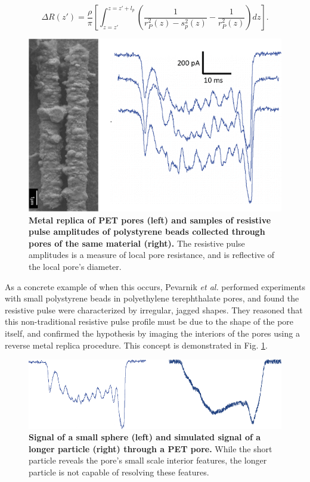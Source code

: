 			\begin{equation} \label{eq:localdR}
				\Delta R\left(z'\right)=\frac{\rho}{\pi}\left[\int_{z=z'}^{z=z'+l_{p}}\left(\frac{1}{r^{2}_{P}\left(z\right)-s^{2}_{p}\left(z\right)}-\frac{1}{r^{2}_{P}\left(z\right)}\right)dz\right].
			\end{equation}
			
			\begin{figure}
				\includegraphics[width=.5\textwidth]{particlesreveal.png}
				\caption{\textbf{Metal replica of PET pores (left) and samples of resistive pulse amplitudes of polystyrene beads collected through pores of the same material (right).} The resistive pulse amplitudes is a measure of local pore resistance, and is reflective of the local pore's diameter.}
				\label{fig:particlesreveal}
			\end{figure}

			
			
			As a concrete example of when this occurs, Pevarnik \textit{et al.} performed experiments with small polystyrene beads in polyethylene terephthalate pores, and found the resistive pulse were characterized by irregular, jagged shapes. They reasoned that this non-traditional resistive pulse profile must be due to the shape of the pore itself, and confirmed the hypothesis by imaging the interiors of the pores using a reverse metal replica procedure. This concept is demonstrated in Fig. \ref{fig:particlesreveal}.
			
			
			\begin{figure}
				\includegraphics[width=\textwidth]{short_long_simulated.png}
				\caption{\textbf{Signal of a small sphere (left) and simulated signal of a longer particle (right) through a PET pore.} While the short particle reveals the pore's small scale interior features, the longer particle is not capable of resolving these features.}
				\label{fig:short_long_simulated}
			\end{figure}

